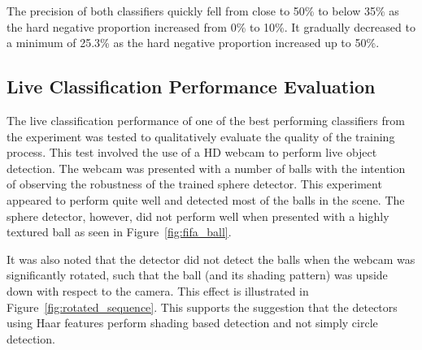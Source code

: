 \documentclass{sig-alternate-05-2015}
\begin{document}
{    The precision of both classifiers quickly fell from close to 50\% to below 35\% as the hard negative proportion increased from 0\% to 10\%. It gradually decreased to a minimum of 25.3\% as the hard negative proportion increased up to 50\%.

    \subsection{Live Classification Performance Evaluation} {
  		The live classification performance of one of the best performing classifiers from the experiment was tested to qualitatively evaluate the quality of the training process.
  		This test involved the use of a HD webcam to perform live object detection. The webcam was presented with a number of balls with the intention of observing the robustness of the trained sphere detector.
  		This experiment appeared to perform quite well and detected most of the balls in the scene. The sphere detector, however, did not perform well when presented with a highly textured ball as seen in Figure~\ref{fig:fifa_ball}.

  		It was also noted that the detector did not detect the balls when the webcam was significantly rotated, such that the ball (and its shading pattern) was upside down with respect to the camera. This effect is illustrated in Figure~\ref{fig:rotated_sequence}. This supports the suggestion that the detectors using Haar features perform shading based detection and not simply circle detection.
    }




		\newcommand{\includesequence}[1]{\texttt{[image: images/rotation/\#1]}}

}
\end{document}
